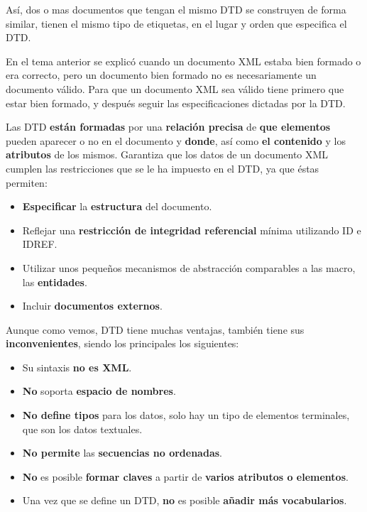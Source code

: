 Así, dos o mas documentos que tengan el mismo DTD se construyen de forma similar, tienen el mismo tipo de etiquetas, en el lugar y orden que especifica el DTD.

En el tema anterior se explicó cuando un documento XML estaba bien formado o era correcto, pero un documento bien formado no es necesariamente un documento válido. Para que un documento XML sea válido tiene primero que estar bien formado, y después seguir las especificaciones dictadas por la DTD.

Las DTD \textbf{están formadas} por una \textbf{relación precisa} de \textbf{que elementos} pueden aparecer o no en el documento y \textbf{donde}, así como \textbf{el contenido} y los \textbf{atributos} de los mismos. Garantiza que los datos de un documento XML cumplen las restricciones que se le ha impuesto en el DTD, ya que éstas permiten:

\begin{itemize}
    \item \textbf{Especificar} la \textbf{estructura} del documento.
    \item Reflejar una \textbf{restricción de integridad referencial} mínima utilizando ID e IDREF.
    \item Utilizar unos pequeños mecanismos de abstracción comparables a las macro, las \textbf{entidades}.
    \item Incluir \textbf{documentos externos}.
\end{itemize}

Aunque como vemos, DTD tiene muchas ventajas, también tiene sus \textbf{inconvenientes}, siendo los principales los siguientes:

\begin{itemize}
    \item Su sintaxis \textbf{no es XML}.
    \item \textbf{No} soporta \textbf{espacio de nombres}.
    \item \textbf{No define tipos} para los datos, solo hay un tipo de elementos terminales, que son los datos textuales.
    \item\textbf{ No permite} las \textbf{secuencias no ordenadas}.
    \item \textbf{No} es posible \textbf{formar claves} a partir de \textbf{varios atributos o elementos}.
    \item Una vez que se define un DTD, \textbf{no} es posible \textbf{añadir más vocabularios}.
\end{itemize}


